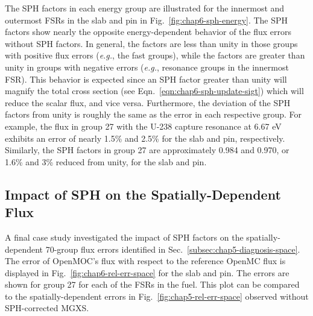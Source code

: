The \ac{SPH} factors in each energy group are illustrated for the innermost and outermost \ac{FSR}s in the slab and pin in Fig.~\ref{fig:chap6-sph-energy}. The \ac{SPH} factors show nearly the opposite energy-dependent behavior of the flux errors without \ac{SPH} factors. In general, the factors are less than unity in those groups with positive flux errors (\textit{e.g.}, the fast groups), while the factors are greater than unity in groups with negative errors (\textit{e.g.}, resonance groups in the innermost \ac{FSR}). This behavior is expected since an \ac{SPH} factor greater than unity will magnify the total cross section (see Eqn.~\ref{eqn:chap6-sph-update-sigt}) which will reduce the scalar flux, and vice versa. Furthermore, the deviation of the \ac{SPH} factors from unity is roughly the same as the error in each respective group. For example, the flux in group 27 with the U-238 capture resonance at 6.67 eV exhibits an error of nearly 1.5\% and 2.5\% for the slab and pin, respectively. Similarly, the \ac{SPH} factors in group 27 are approximately 0.984 and 0.970, or 1.6\% and 3\% reduced from unity, for the slab and pin.

\subsection{Impact of SPH on the Spatially-Dependent Flux}
\label{subsec:chap6-sph-flux-space}

A final case study investigated the impact of \ac{SPH} factors on the spatially-dependent 70-group flux errors identified in Sec.~\ref{subsec:chap5-diagnosis-space}. The error of OpenMOC's flux with respect to the reference OpenMC flux is displayed in Fig.~\ref{fig:chap6-rel-err-space} for the slab and pin. The errors are shown for group 27 for each of the \ac{FSR}s in the fuel. This plot can be compared to the spatially-dependent errors in Fig.~\ref{fig:chap5-rel-err-space} observed without \ac{SPH}-corrected \ac{MGXS}.


